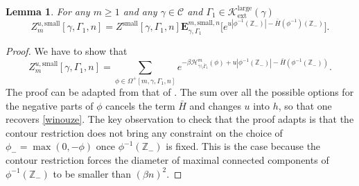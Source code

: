 \documentclass[10pt]{amsart}
\let\mathcal\mathscr
\numberwithin{equation}{section}
\theoremstyle{plain}
\newtheorem{lemma}[theorem]{Lemma}
\theoremstyle{definition}
\newcommand{\ext}{\mathrm{ext}}
\newcommand{\sm}{\mathrm{small}}
\newcommand{\larg}{\mathrm{large}}
\newcommand{\cH}{{\ensuremath{\mathcal H}} }
\newcommand{\cC}{{\ensuremath{\mathcal C}} }
\newcommand{\cK}{{\ensuremath{\mathcal K}} }
\newcommand{\bE}{{\ensuremath{\mathbf E}} }
\newcommand{\bbZ}{{\ensuremath{\mathbb Z}} }
\newcommand{\gb}{\beta}
\newcommand{\gG}{\Gamma}
\newcommand{\gO}{\Omega}
\begin{document}
\begin{lemma}\label{zilak}
For any $m\ge 1$ and any $\gamma\in \cC$ and $\gG_1\in \cK^{\larg}_{\ext}(\gamma)$
\begin{equation*}%
Z^{u,\sm}_{m}[\gamma,\Gamma_1,n]= Z^{\sm}[\gamma,\gG_1,n] \bE^{m,\sm,n}_{\gamma,\gG_1}\bigl[ e^{u |\phi^{-1}(\bbZ_-)|- \bar H(\phi^{-1})(\bbZ_-)}\bigr].
\end{equation*}
\end{lemma}
\begin{proof}
We have to show that
\begin{equation*}
Z^{u,\sm}_{m}[\gamma,\Gamma_1,n]= \sum_{\phi \in \gO^+[m,\gamma,\gG_1,n]}e^{-\gb \cH^m_{\bar \gamma \setminus \bar \gG_1}(\phi)+u|\phi^{-1}(\bbZ_-)|-\bar H(\phi^{-1}(\bbZ_-))}.
\end{equation*}
The proof can be adapted from that of \cite[Lem.\,3.1]{cf:part1}. The sum over all the possible options for
the negative parts of $\phi$ cancels the term $\bar H$ and changes $u$ into $h$, so that one recovers \eqref{winouze}.
The key observation to check that the proof adapts is that
the contour restriction does not bring any constraint on the choice of $\phi_-=\max(0,-\phi)$ once $\phi^{-1}(\bbZ_-)$ is fixed.
This is the case
because the contour restriction forces the diameter of maximal connected components of $\phi^{-1}(\bbZ_-)$
to be smaller than $(\gb n)^2$.
\end{proof}
\end{document}
